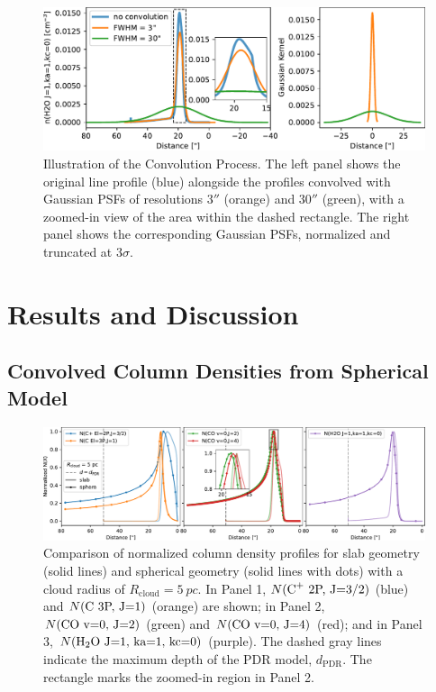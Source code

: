 \documentclass[12pt,a4paper]{article}
\newcommand{\mr}{\mathrm}
\begin{document}
\begin{figure}[h]
    \centering
    \includegraphics[width=.88\textwidth,keepaspectratio]{convolution.pdf}
    \caption{Illustration of the Convolution Process. The left panel shows the original line profile (blue) alongside the profiles convolved with Gaussian PSFs of resolutions $3''$ (orange) and $30''$ (green), with a zoomed-in view of the area within the dashed rectangle. The right panel shows the corresponding Gaussian PSFs, normalized and truncated at $3\sigma$.} \label{fig:convolution}
\end{figure}

\section{Results and Discussion} \label{sec:results}
\subsection{Convolved Column Densities from Spherical Model} \label{sec:convcolden}

\begin{figure}
    \centering
    \includegraphics[width=\textwidth,keepaspectratio]{column_densities.pdf}
    \caption{Comparison of normalized column density profiles for slab geometry (solid lines) and spherical geometry (solid lines with dots) with a cloud radius of $R_\mr{cloud} = \qty{5}{pc}$. In Panel 1, $N(\ce{C^+}\ \text{2P, J=3/2})$ (blue) and $N(\ce{C}\ \text{3P, J=1})$ (orange) are shown; in Panel 2, $N(\ce{CO}\ \text{v=0, J=2})$ (green) and $N(\ce{CO}\ \text{v=0, J=4})$ (red); and in Panel 3, $N(\ce{H2O}\ \text{J=1, ka=1, kc=0})$ (purple). The dashed gray lines indicate the maximum depth of the PDR model, $d_\mr{PDR}$. The rectangle marks the zoomed-in region in Panel 2.} \label{fig:colden}  
\end{figure}
\end{document}
